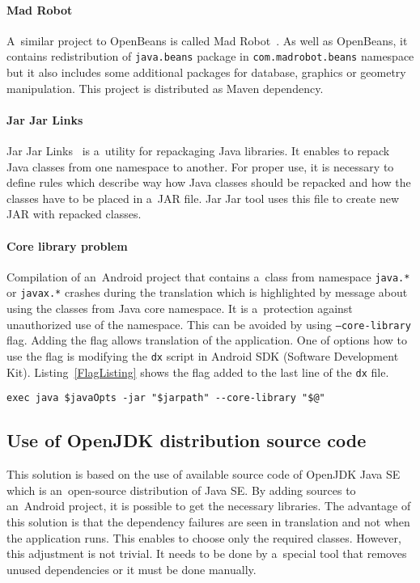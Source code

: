 \paragraph{Mad Robot}
A~similar project to OpenBeans is called Mad Robot~\cite{MadRobot}. As well as OpenBeans, it contains redistribution of
\texttt{java.beans} package in \texttt{com.madrobot.beans} namespace but it also includes some additional packages for
database, graphics or geometry manipulation. This project is distributed as Maven dependency.

\paragraph{Jar Jar Links}
Jar Jar Links~\cite{JarJar} is a~utility for repackaging Java libraries. It enables to repack Java classes from one
namespace to another. For proper use, it is necessary to define rules which describe way how Java classes should be
repacked and how the classes have to be placed in a~JAR file. Jar Jar tool uses this file to create new JAR with
repacked classes.

\paragraph{Core library problem}
Compilation of an~Android project that contains a~class from namespace \texttt{java.*} or \texttt{javax.*} crashes
during the translation which is highlighted by message about using the classes from Java core namespace. It is
a~protection against unauthorized use of the namespace. This can be avoided by using \texttt{--core-library} flag.
Adding the flag allows translation of the application. One of options how to use the flag is modifying the \texttt{dx}
script in Android SDK (Software Development Kit). Listing~\ref{FlagListing} shows the flag added to the last line of the
\texttt{dx} file.
\\
\begin{lstlisting}[captionpos={b},caption={Core library flag in the last line of \texttt{dx} script.},frame={lines},
label={FlagListing},basicstyle=\footnotesize]
exec java $javaOpts -jar "$jarpath" --core-library "$@"
\end{lstlisting}

\subsection{Use of OpenJDK distribution source code}\label{OpenJdkDistrSection}
This solution is based on the use of available source code of OpenJDK Java SE~\cite{OpenJDK} which is an~open-source
distribution of Java SE. By adding sources to an~Android project, it is possible to get the necessary libraries. The
advantage of this solution is that the dependency failures are seen in translation and not when the application runs.
This enables to choose only the required classes. However, this adjustment is not trivial. It needs to be done by
a~special tool that removes unused dependencies or it must be done manually.

